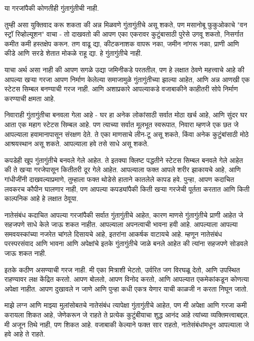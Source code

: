 या गरजांपैकी कोणतीही गुंतागुंतीची नाही.

तुम्ही असा युक्तिवाद करू शकता की अन्न मिळवणे गुंतागुंतीचे असू शकते, पण मसानोबू फुकुओकाचे "वन स्ट्रॉ रिव्होल्यूशन" वाचा - तो दाखवतो की आपण एका एकरावर कुटुंबासाठी पुरेसे उगवू शकतो, निसर्गात कमीत कमी हस्तक्षेप करून. तण वाढू द्या, कीटकनाशक वापरू नका, जमीन नांगरू नका, प्राणी आणि कीडे आणि सरडे शेतात मोकळे राहू द्या. हे गुंतागुंतीचे नाही.

याचा अर्थ असा नाही की आपण सगळे उद्या जमिनीकडे परततील, पण हे लक्षात ठेवणे महत्त्वाचे आहे की आपल्या खऱ्या गरजा आपण निर्माण केलेल्या समाजामुळे गुंतागुंतीच्या झाल्या आहेत, आणि अन्न आणखी एक स्टेटस सिम्बल बनण्याची गरज नाही. आणि अशाप्रकारे आपल्याकडे वजाबाकीने काहीतरी सोपे निर्माण करण्याची क्षमता आहे.

निवाराही गुंतागुंतीचा बनवला गेला आहे - घर हा अनेक लोकांसाठी सर्वात मोठा खर्च आहे, आणि सुंदर घर आता एक महाग स्टेटस सिम्बल आहे. पण त्याच्या सर्वात मूलभूत स्वरूपात, निवारा म्हणजे एक छत जे आपल्याला हवामानापासून संरक्षण देते. ते एका माणसाचे लीन-टू असू शकते, किंवा अनेक कुटुंबांसाठी मोठे आश्रयस्थान असू शकते. आपल्याला हवे तसे साधे असू शकते.

कपडेही खूप गुंतागुंतीचे बनवले गेले आहेत. ते इतक्या क्लिष्ट पद्धतीने स्टेटस सिम्बल बनवले गेले आहेत की ते खऱ्या गरजेपासून कितीतरी दूर गेले आहेत. आपल्याला फक्त आपले शरीर झाकायचे आहे, आणि गांधीजींनी दाखवल्याप्रमाणे, तुम्हाला फक्त थोडेसे हाताने कातलेले कापड हवे. पुन्हा, आपण कदाचित लवकरच कौपीन घालणार नाही, पण आपल्या कपड्यांपैकी किती खऱ्या गरजेची पूर्तता करतात आणि किती काल्पनिक आहे हे लक्षात ठेवूया.

नातेसंबंध कदाचित आपल्या गरजांपैकी सर्वात गुंतागुंतीचे आहेत, कारण माणसे गुंतागुंतीचे प्राणी आहेत जे सहजपणे साधे केले जाऊ शकत नाहीत. आपल्याला अपनत्वाची भावना हवी आहे. आपल्याला आपल्या समवयस्कांच्या नजरेत चांगले दिसायचे आहे, इतरांना आकर्षक वाटायचे आहे. म्हणून नातेसंबंध परस्परसंवाद आणि भावना आणि अपेक्षांचे इतके गुंतागुंतीचे जाळे बनले आहेत की त्यांना सहजपणे सोडवले जाऊ शकत नाही.

इतके कठीण असण्याची गरज नाही. मी एका मित्राशी भेटतो, उर्वरित जग विरघळू देतो, आणि उपस्थित राहण्यावर लक्ष केंद्रित करतो. आपण बोलतो, आपण विनोद करतो, आणि आपल्यात एकमेकांकडून कोणत्या अपेक्षा नाहीत. आपण दुखावले न जाणे आणि पुन्हा कधी एकत्र येणार याची काळजी न करता निघून जातो.

माझे लग्न आणि माझ्या मुलांसोबतचे नातेसंबंध त्यापेक्षा गुंतागुंतीचे आहेत, पण मी अपेक्षा आणि गरजा कमी करायला शिकत आहे, जेणेकरून जे राहते ते प्रत्येक कुटुंबीयाचा शुद्ध आनंद आहे त्यांच्या व्यक्तिमत्त्वाबद्दल. मी अजून तिथे नाही, पण शिकत आहे. वजाबाकी केल्याने फक्त सार राहतो, नातेसंबंधांमधून आपल्याला जे हवे आहे ते राहते.

